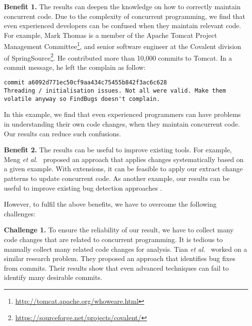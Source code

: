\noindent
\textbf{Benefit 1.} The results can deepen the knowledge on how to correctly maintain concurrent code. Due to the complexity of concurrent programming, we find that even experienced developers can be confused when they maintain relevant code. For example, Mark Thomas is a member of the Apache Tomcat Project Management Committee\footnote{\url{http://tomcat.apache.org/whoweare.html}}, and senior software engineer at the Covalent division of SpringSource\footnote{\url{https://sourceforge.net/projects/covalent/}}. He contributed more than 10,000 commits to Tomcat. In a commit message, he left the complain as follow:

\lstset{numbers=left, breaklines=true,  basicstyle=\ttfamily\tiny,  xleftmargin=3em, tabsize=2}
\begin{lstlisting}
commit a6092d771ec50cf9aa434c75455b842f3ac6c628
Threading / initialisation issues. Not all were valid. Make them volatile anyway so FindBugs doesn't complain.
\end{lstlisting}

\noindent
In this example, we find that even experienced programmers can have problems in understanding their own code changes, when they maintain concurrent code. Our results can reduce such confusions.


\noindent
\textbf{Benefit 2.} The results can be useful to improve existing tools. For example, Meng \emph{et al.}~\cite{conf/pldi/MengKM11} proposed an approach that applies changes systematically based on a given example. With extensions, it can be feasible to apply our extract change patterns to update concurrent code. As another example, our results can be useful to improve existing bug detection approaches \cite{conf/sigsoft/EslamimehrP14}.

However, to fulfil the above benefits, we have to overcome the following challenges:

\noindent
\textbf{Challenge 1.} To ensure the reliability of our result, we have to collect many code changes that are related to concurrent programming. It is tedious to manually collect many related code changes for analysis. Tian \emph{et al.}~\cite{tian2012identifying} worked on a similar research problem. They proposed an approach that identifies bug fixes from commits. Their results show that even advanced techniques can fail to identify many desirable commits.


